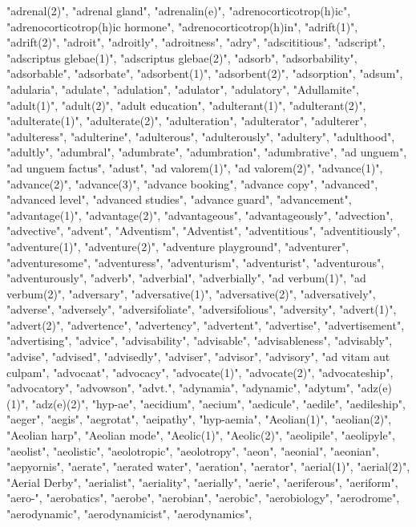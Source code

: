 "adrenal(2)",
"adrenal gland",
"adrenalin(e)",
"adrenocorticotrop(h)ic",
"adrenocorticotrop(h)ic hormone",
"adrenocorticotrop(h)in",
"adrift(1)",
"adrift(2)",
"adroit",
"adroitly",
"adroitness",
"adry",
"adscititious",
"adscript",
"adscriptus glebae(1)",
"adscriptus glebae(2)",
"adsorb",
"adsorbability",
"adsorbable",
"adsorbate",
"adsorbent(1)",
"adsorbent(2)",
"adsorption",
"adsum",
"adularia",
"adulate",
"adulation",
"adulator",
"adulatory",
"Adullamite",
"adult(1)",
"adult(2)",
"adult education",
"adulterant(1)",
"adulterant(2)",
"adulterate(1)",
"adulterate(2)",
"adulteration",
"adulterator",
"adulterer",
"adulteress",
"adulterine",
"adulterous",
"adulterously",
"adultery",
"adulthood",
"adultly",
"adumbral",
"adumbrate",
"adumbration",
"adumbrative",
"ad unguem",
"ad unguem factus",
"adust",
"ad valorem(1)",
"ad valorem(2)",
"advance(1)",
"advance(2)",
"advance(3)",
"advance booking",
"advance copy",
"advanced",
"advanced level",
"advanced studies",
"advance guard",
"advancement",
"advantage(1)",
"advantage(2)",
"advantageous",
"advantageously",
"advection",
"advective",
"advent",
"Adventism",
"Adventist",
"adventitious",
"adventitiously",
"adventure(1)",
"adventure(2)",
"adventure playground",
"adventurer",
"adventuresome",
"adventuress",
"adventurism",
"adventurist",
"adventurous",
"adventurously",
"adverb",
"adverbial",
"adverbially",
"ad verbum(1)",
"ad verbum(2)",
"adversary",
"adversative(1)",
"adversative(2)",
"adversatively",
"adverse",
"adversely",
"adversifoliate",
"adversifolious",
"adversity",
"advert(1)",
"advert(2)",
"advertence",
"advertency",
"advertent",
"advertise",
"advertisement",
"advertising",
"advice",
"advisability",
"advisable",
"advisableness",
"advisably",
"advise",
"advised",
"advisedly",
"adviser",
"advisor",
"advisory",
"ad vitam aut culpam",
"advocaat",
"advocacy",
"advocate(1)",
"advocate(2)",
"advocateship",
"advocatory",
"advowson",
"advt.",
"adynamia",
"adynamic",
"adytum",
"adz(e)(1)",
"adz(e)(2)",
"hyp-ae",
"aecidium",
"aecium",
"aedicule",
"aedile",
"aedileship",
"aeger",
"aegis",
"aegrotat",
"aeipathy",
"hyp-aemia",
"Aeolian(1)",
"aeolian(2)",
"Aeolian harp",
"Aeolian mode",
"Aeolic(1)",
"Aeolic(2)",
"aeolipile",
"aeolipyle",
"aeolist",
"aeolistic",
"aeolotropic",
"aeolotropy",
"aeon",
"aeonial",
"aeonian",
"aepyornis",
"aerate",
"aerated water",
"aeration",
"aerator",
"aerial(1)",
"aerial(2)",
"Aerial Derby",
"aerialist",
"aeriality",
"aerially",
"aerie",
"aeriferous",
"aeriform",
"aero-",
"aerobatics",
"aerobe",
"aerobian",
"aerobic",
"aerobiology",
"aerodrome",
"aerodynamic",
"aerodynamicist",
"aerodynamics",
